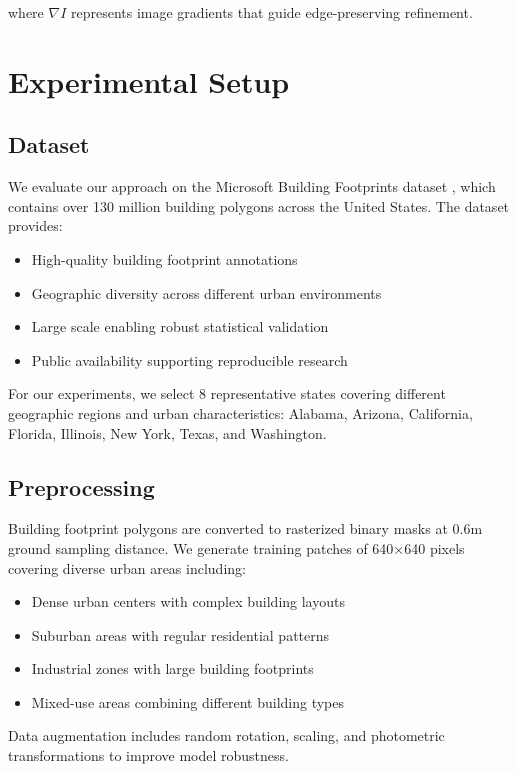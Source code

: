 \documentclass{article}
\begin{document}
where $\nabla I$ represents image gradients that guide edge-preserving refinement.

\section{Experimental Setup}

\subsection{Dataset}

We evaluate our approach on the Microsoft Building Footprints dataset \cite{microsoft2018buildings}, which contains over 130 million building polygons across the United States. The dataset provides:

\begin{itemize}
\item High-quality building footprint annotations
\item Geographic diversity across different urban environments  
\item Large scale enabling robust statistical validation
\item Public availability supporting reproducible research
\end{itemize}

For our experiments, we select 8 representative states covering different geographic regions and urban characteristics: Alabama, Arizona, California, Florida, Illinois, New York, Texas, and Washington.

\subsection{Preprocessing}

Building footprint polygons are converted to rasterized binary masks at 0.6m ground sampling distance. We generate training patches of 640×640 pixels covering diverse urban areas including:

\begin{itemize}
\item Dense urban centers with complex building layouts
\item Suburban areas with regular residential patterns  
\item Industrial zones with large building footprints
\item Mixed-use areas combining different building types
\end{itemize}

Data augmentation includes random rotation, scaling, and photometric transformations to improve model robustness.
\end{document}
